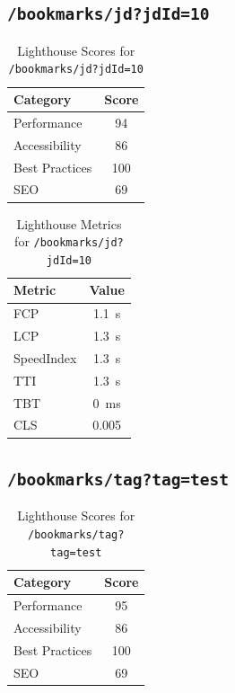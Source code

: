 \subsection{\texttt{/bookmarks/jd?jdId=10}}

\begin{table}[H]
  \centering
  \caption{Lighthouse Scores for \texttt{/bookmarks/jd?jdId=10}}
  \begin{tabular}{|l|c|}
    \hline
    Category & Score \\ \hline
    Performance & 94 \\ \hline
    Accessibility & 86 \\ \hline
    Best Practices & 100 \\ \hline
    SEO & 69 \\ \hline
  \end{tabular}
\end{table}

\begin{table}[H]
  \centering
  \caption{Lighthouse Metrics for \texttt{/bookmarks/jd?jdId=10}}
  \begin{tabular}{|l|c|}
    \hline
    Metric & Value \\ \hline
    FCP & 1.1 s \\ \hline
    LCP & 1.3 s \\ \hline
    SpeedIndex & 1.3 s \\ \hline
    TTI & 1.3 s \\ \hline
    TBT & 0 ms \\ \hline
    CLS & 0.005 \\ \hline
  \end{tabular}
\end{table}
\subsection{\texttt{/bookmarks/tag?tag=test}}

\begin{table}[H]
  \centering
  \caption{Lighthouse Scores for \texttt{/bookmarks/tag?tag=test}}
  \begin{tabular}{|l|c|}
    \hline
    Category & Score \\ \hline
    Performance & 95 \\ \hline
    Accessibility & 86 \\ \hline
    Best Practices & 100 \\ \hline
    SEO & 69 \\ \hline
  \end{tabular}
\end{table}

